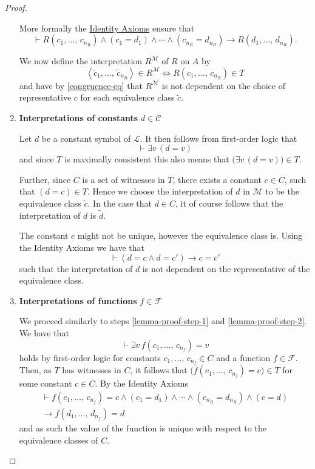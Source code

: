 \documentclass[../../main.tex]{subfiles}
\begin{document}
\begin{proof}
\begin{enumerate}
        More formally the \hyperref[identity-axioms]{Identity Axioms} ensure that
        $$\vdash R(c_1,\ldots,\,c_{n_R}) \wedge (c_1 = d_1) \wedge \cdots \wedge (c_{n_R} = d_{n_R}) \rightarrow R(d_1,\ldots,\,d_{n_R}).$$

        We now define the interpretation $R^\mathcal{M}$ of $R$ on $A$ by
        $$\left<\tilde{c}_1,\ldots,\,\tilde{c}_{n_R}\right> \in R^\mathcal{M} \iff R(c_1,\ldots,\,c_{n_R}) \in T$$
        and have by \eqref{congruence-eq} that $R^\mathcal{M}$ is not dependent on the choice of representative $c$ for each equivalence class $\tilde{c}$.

        \item \label{lemma-proof-step-2} \textbf{Interpretations of constants} $d \in \mathcal{C}$
        
        Let $d$ be a constant symbol of $\mathcal{L}$.
        It then follows from first-order logic that 
        $$\vdash \exists v \, (d = v)$$
        and since $T$ is maximally consistent this also means that $\big(\exists v \, (d = v)\big) \in T$.
        
        Further, since $C$ is a set of witnesses in $T$, there exists a constant $c \in C$, such that $(d = c) \in T$.
        Hence we choose the interpretation of $d$ in $\mathcal{M}$ to be the equivalence class $\tilde{c}$.
        In the case that $d \in C$, it of course follows that the interpretation of $d$ is $\tilde{d}$.

        The constant $c$ might not be unique, however the equivalence class is.
        Using the Identity Axioms we have that
        $$\vdash (d = c \wedge d = c') \rightarrow c = c'$$
        such that the interpretation of $d$ is not dependent on the representative of the equivalence class.

        \item \label{lemma-proof-step-3}\textbf{Interpretations of functions} $f \in \mathcal{F}$
        
        We proceed similarly to steps \ref{lemma-proof-step-1} and \ref{lemma-proof-step-2}.
        We have that
        $$\vdash \exists v\, f(c_1,\ldots,\, c_{n_f}) = v$$
        holds by first-order logic for constants $c_1,\ldots,\, c_{n_f} \in C$ and a function $f \in \mathcal{F}$.
        Then, as $T$ has witnesses in $C$, it follows that $\big(f(c_1,\ldots,\, c_{n_f}) = c\big) \in T$ for some constant $c \in C$.
        By the Identity Axioms
        \begin{multline}\label{function-congruence-eq}
            \vdash f(c_1,\ldots,\,c_{n_f}) = c \wedge (c_1 = d_1) \wedge \cdots \wedge (c_{n_R} = d_{n_R}) \wedge (c = d) \\
            \rightarrow f(d_1,\ldots,\,d_{n_f})= d
        \end{multline}
        and as such the value of the function is unique with respect to the equivalence classes of $C$.


\end{enumerate}
\end{proof}
\end{document}
